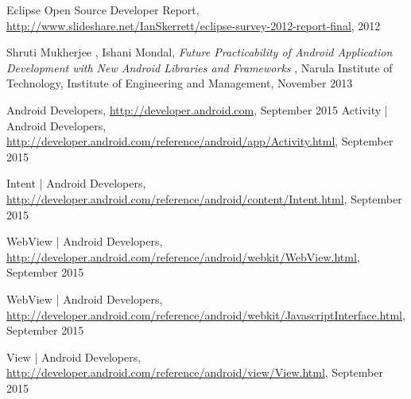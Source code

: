 \begin{thebibliography}{9}
	Eclipse Open Source Developer Report, 
	\url{http://www.slideshare.net/IanSkerrett/eclipse-survey-2012-report-final},
	2012
	
	Shruti Mukherjee , Ishani Mondal, 
	\emph{Future Practicability of Android Application Development with New Android Libraries and Frameworks },
	Narula Institute of Technology, 
	Institute of Engineering and Management,
	November 2013 
	
	Android Developers,
	\url{http://developer.android.com},
	September 2015
	Activity | Android Developers,
	\url{http://developer.android.com/reference/android/app/Activity.html},
	September 2015
	
	Intent | Android Developers,
	\url{http://developer.android.com/reference/android/content/Intent.html},
	September 2015

	WebView | Android Developers,
	\url{http://developer.android.com/reference/android/webkit/WebView.html},
	September 2015

	WebView | Android Developers,
	\url{http://developer.android.com/reference/android/webkit/JavascriptInterface.html},
	September 2015

	View | Android Developers,
	\url{http://developer.android.com/reference/android/view/View.html},
	September 2015	
\end{thebibliography}